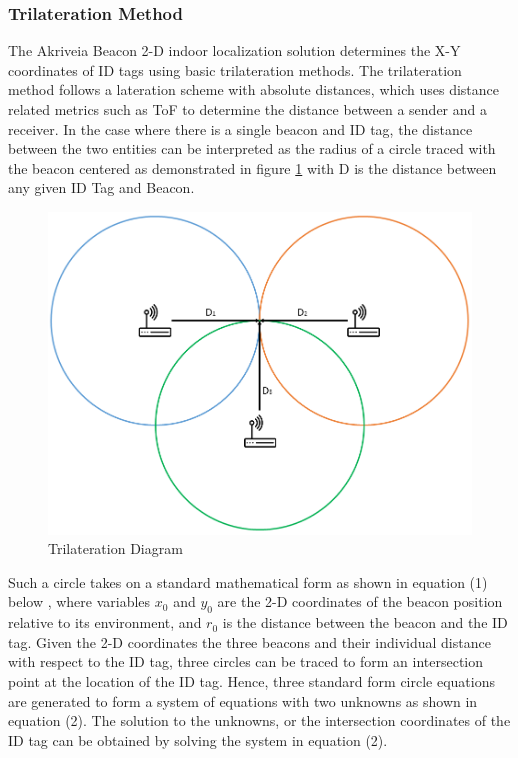 \pagebreak
\subsubsection{Trilateration Method}
\medskip
The Akriveia Beacon 2-D indoor localization solution determines the X-Y coordinates of ID tags using basic trilateration methods. The trilateration method follows a lateration scheme with absolute distances, which uses distance related metrics such as ToF to determine the distance between a sender and a receiver. In the case where there is a single beacon and ID tag, the distance between the two entities can be interpreted as the radius of a circle traced with the beacon centered as demonstrated in figure \ref{tri} with D is the distance between any given ID Tag and Beacon. 

\medskip
\begin{figure}[H]
\centering
    \includegraphics[scale=0.55]{./images/Tri.png}
    \caption{Trilateration Diagram}
    \label{tri}
\end{figure}


\medskip
Such a circle takes on a standard mathematical form as shown in equation (1) below \cite{R2-1-2-1}, where variables $x_0$ and $y_0$ are the 2-D coordinates of the beacon position relative to its environment, and $r_0$ is the distance between the beacon and the ID tag. Given the 2-D coordinates the three beacons and their individual distance with respect to the ID tag, three circles can be traced to form an intersection point at the location of the ID tag. Hence, three standard form circle equations are generated to form a system of equations with two unknowns as shown in equation (2). The solution to the unknowns, or the intersection coordinates of the ID tag can be obtained by solving the system in equation (2).


